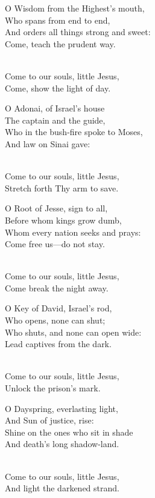 \begin{lyrics}
O Wisdom from the Highest’s mouth,\\
Who spans from end to end,\\
And orders all things strong and sweet:\\
Come, teach the prudent way.

\\
Come to our souls, little Jesus,\\
Come, show the light of day.

O Adonai, of Israel’s house\\
The captain and the guide,\\
Who in the bush-fire spoke to Moses,\\
And law on Sinai gave:

\\
Come to our souls, little Jesus,\\
Stretch forth Thy arm to save.

O Root of Jesse, sign to all,\\
Before whom kings grow dumb,\\
Whom every nation seeks and prays:\\
Come free us—do not stay.

\\
Come to our souls, little Jesus,\\
Come break the night away.

O Key of David, Israel’s rod,\\
Who opens, none can shut;\\
Who shuts, and none can open wide:\\
Lead captives from the dark.

\\
Come to our souls, little Jesus,\\
Unlock the prison’s mark.

O Dayspring, everlasting light,\\
And Sun of justice, rise:\\
Shine on the ones who sit in shade\\
And death’s long shadow-land.

\\
Come to our souls, little Jesus,\\
And light the darkened strand.


\end{lyrics}
